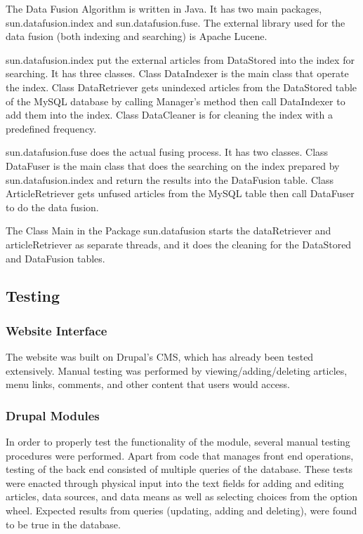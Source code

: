 \documentclass[10pt]{article} %
\begin{document}
The Data Fusion Algorithm is written in Java. It has two main packages, sun.datafusion.index and sun.datafusion.fuse. The external library used for the data fusion (both indexing and searching) is Apache Lucene.

sun.datafusion.index put the external articles from DataStored into the index for searching. It has three classes. Class DataIndexer is the main class that operate the index. Class DataRetriever gets unindexed articles from the DataStored table of the MySQL database by calling Manager’s method then call DataIndexer to add them into the index. Class DataCleaner is for cleaning the index with a predefined frequency.

sun.datafusion.fuse does the actual fusing process. It has two classes. Class DataFuser is the main class that does the searching on the index prepared by sun.datafusion.index and return the results into the DataFusion table. Class ArticleRetriever gets unfused articles from the MySQL table then call DataFuser to do the data fusion.

The Class Main in the Package sun.datafusion starts the dataRetriever and articleRetriever as separate threads, and it does the cleaning for the DataStored and DataFusion tables.  

\subsection{Testing}

\subsubsection{Website Interface}

The website was built on Drupal’s CMS, which has already been tested extensively. Manual testing was performed by viewing/adding/deleting articles, menu links, comments, and other content that users would access.

\subsubsection{Drupal Modules}

In order to properly test the functionality of the module, several manual testing procedures were performed. Apart from code that manages front end operations, testing of the back end consisted of multiple queries of the database. These tests were enacted through physical input into the text fields for adding and editing articles, data sources, and data means as well as selecting choices from the option wheel. Expected results from queries (updating, adding and deleting), were found to be true in the database. 
\end{document}
